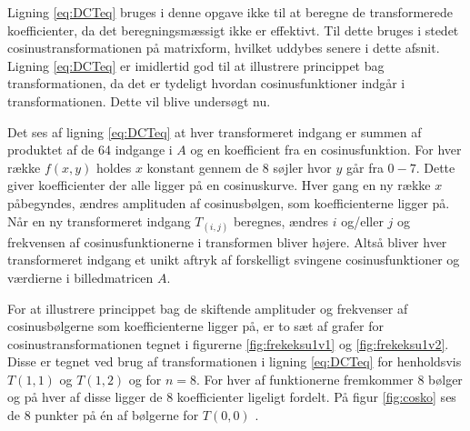 Ligning \ref{eq:DCTeq} bruges i denne opgave ikke til at beregne de transformerede koefficienter, da det beregningsmæssigt ikke er effektivt. Til dette bruges i stedet cosinustransformationen på matrixform, hvilket uddybes senere i dette afsnit. Ligning \ref{eq:DCTeq} er imidlertid god til at illustrere princippet bag transformationen, da det er tydeligt hvordan cosinusfunktioner indgår i transformationen. Dette vil blive undersøgt nu.

Det ses af ligning \vref{eq:DCTeq} at hver transformeret indgang er summen af produktet af de 64 indgange i $A$ og en koefficient fra en cosinusfunktion. For hver række $f(x,y)$ holdes $x$ konstant gennem de 8 søjler hvor $y$ går fra $0-7$. Dette giver koefficienter der alle ligger på en cosinuskurve. Hver gang en ny række $x$ påbegyndes, ændres amplituden af cosinusbølgen, som koefficienterne ligger på.\\
Når en ny transformeret indgang $T_{(i,j)}$ beregnes, ændres $i$ og/eller $j$ og frekvensen af cosinusfunktionerne i transformen bliver højere. Altså bliver hver transformeret indgang et unikt aftryk af forskelligt svingene cosinusfunktioner og værdierne i billedmatricen $A$.

For at illustrere princippet bag de skiftende amplituder og frekvenser af cosinusbølgerne som koefficienterne ligger på, er to sæt af grafer for cosinustransformationen tegnet i figurerne \ref{fig:frekeksu1v1} og \ref{fig:frekeksu1v2}. Disse er tegnet ved brug af transformationen i ligning \vref{eq:DCTeq} for henholdsvis $T(1,1)$ og $T(1,2)$ og for $n=8$. For hver af funktionerne fremkommer 8 bølger og på hver af disse ligger de 8 koefficienter ligeligt fordelt. På figur \ref{fig:cosko} ses de 8 punkter på én af bølgerne for $T(0,0)$ \citep{whydomath_dct}.

